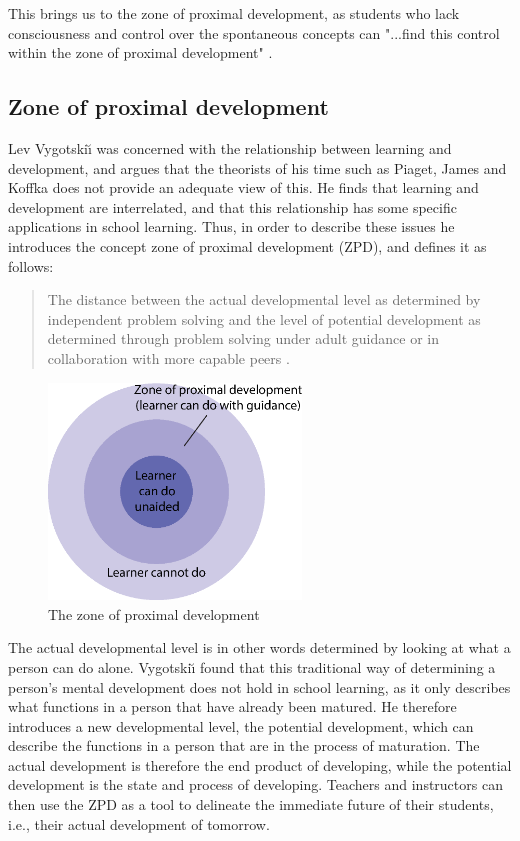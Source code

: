 This brings us to the zone of proximal development, as students who lack consciousness and control over the spontaneous concepts can "...find this control within the zone of proximal development" \citep[p. 194]{vygotsky2012thought}.

\subsection{Zone of proximal development}
Lev Vygotski{\u\i} was concerned with the relationship between learning and development, and argues that the theorists of his time such as Piaget, James and Koffka does not provide an adequate view of this. He finds that learning and development are interrelated, and that this relationship has some specific applications in school learning. \citep[p. 84]{vygotskiui1978mind} Thus, in order to describe these issues he introduces the concept zone of proximal development (ZPD), and defines it as follows:

\begin{quote}The distance between the actual developmental level as determined by independent problem solving and the level of potential development as determined through problem solving under adult guidance or in collaboration with more capable peers \citep[p. 86]{vygotskiui1978mind}.
\end{quote}

\begin{figure}
\centering
\includegraphics[width=0.6\textwidth]{img/theoretical/zpd.eps}
\caption{The zone of proximal development \citep{wiki:zpd}}
\label{fig:zpd}
\end{figure}

The actual developmental level is in other words determined by looking at what a person can do alone. Vygotski{\u\i} found that this traditional way of determining a person's mental development does not hold in school learning, as it only describes what functions in a person that have already been matured. He therefore introduces a new developmental level, the potential development, which can describe the functions in a person that are in the process of maturation. The actual development is therefore the end product of developing, while the potential development is the state and process of developing. Teachers and instructors can then use the ZPD as a tool to delineate the immediate future of their students, i.e., their actual development of tomorrow.

